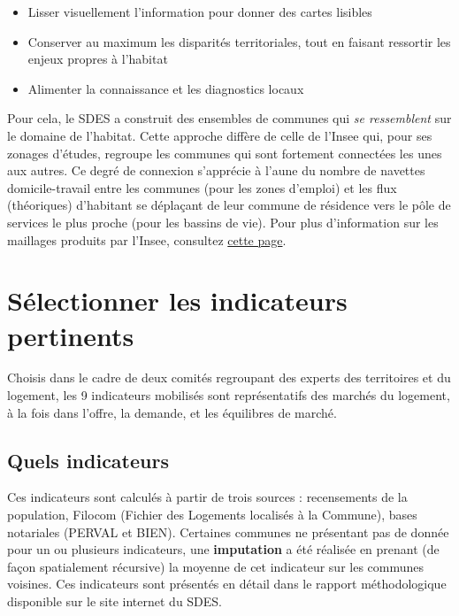 \documentclass[12pt, a4paper]{article}
\begin{document}
\begin{itemize}
\item Lisser visuellement l'information pour donner des cartes lisibles
\item Conserver au maximum les disparités territoriales, tout en faisant ressortir les enjeux propres à l'habitat
\item Alimenter la connaissance et les diagnostics locaux
\end{itemize}


Pour cela, le SDES a construit des ensembles de communes qui \emph{se ressemblent} sur le domaine de l'habitat. Cette approche diffère de celle de l'Insee qui, pour ses zonages d'études, regroupe les communes qui sont fortement connectées les unes aux autres. Ce degré de connexion s'apprécie à l'aune du nombre de navettes domicile-travail entre les communes (pour les zones d'emploi) et les flux (théoriques) d'habitant se déplaçant de leur commune de résidence vers le pôle de services le plus proche (pour les bassins de vie). Pour plus d'information sur les maillages produits par l'Insee, consultez \href{https://www.insee.fr/fr/information/2114631}{cette page}.

\section{Sélectionner les indicateurs pertinents}

Choisis dans le cadre de deux comités regroupant des experts des territoires et du logement, les 9 indicateurs mobilisés sont représentatifs des marchés du logement, à la fois dans l'offre, la demande, et les équilibres de marché.

\subsection{Quels indicateurs}

Ces indicateurs sont calculés à partir de trois sources : recensements de la population, Filocom (Fichier des Logements localisés à la Commune), bases notariales (PERVAL et BIEN). Certaines communes ne présentant pas de donnée pour un ou plusieurs indicateurs, une \textbf{imputation} a été réalisée en prenant (de façon spatialement récursive) la moyenne de cet indicateur sur les communes voisines. Ces indicateurs sont présentés en détail dans le rapport méthodologique disponible sur le site internet du SDES.
\end{document}
